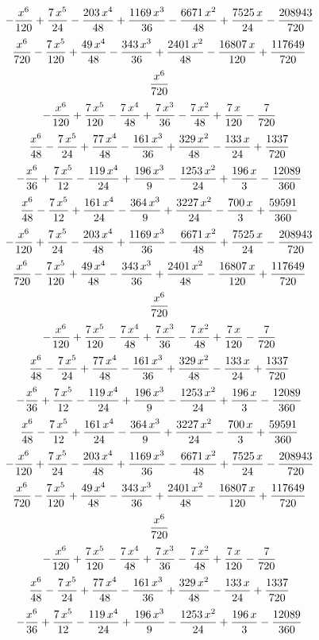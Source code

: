 $$-{{x^6}\over{120}}+{{7\,x^5}\over{24}}-{{203\,x^4}\over{48}}+{{1169
 \,x^3}\over{36}}-{{6671\,x^2}\over{48}}+{{7525\,x}\over{24}}-{{
 208943}\over{720}}$$
$${{x^6}\over{720}}-{{7\,x^5}\over{120}}+{{49\,x^4}\over{48}}-{{343\,
 x^3}\over{36}}+{{2401\,x^2}\over{48}}-{{16807\,x}\over{120}}+{{
 117649}\over{720}}$$
$${{x^6}\over{720}}$$
$$-{{x^6}\over{120}}+{{7\,x^5}\over{120}}-{{7\,x^4}\over{48}}+{{7\,x^
 3}\over{36}}-{{7\,x^2}\over{48}}+{{7\,x}\over{120}}-{{7}\over{720}}$$
$${{x^6}\over{48}}-{{7\,x^5}\over{24}}+{{77\,x^4}\over{48}}-{{161\,x^
 3}\over{36}}+{{329\,x^2}\over{48}}-{{133\,x}\over{24}}+{{1337}\over{
 720}}$$
$$-{{x^6}\over{36}}+{{7\,x^5}\over{12}}-{{119\,x^4}\over{24}}+{{196\,
 x^3}\over{9}}-{{1253\,x^2}\over{24}}+{{196\,x}\over{3}}-{{12089
 }\over{360}}$$
$${{x^6}\over{48}}-{{7\,x^5}\over{12}}+{{161\,x^4}\over{24}}-{{364\,x
 ^3}\over{9}}+{{3227\,x^2}\over{24}}-{{700\,x}\over{3}}+{{59591
 }\over{360}}$$
$$-{{x^6}\over{120}}+{{7\,x^5}\over{24}}-{{203\,x^4}\over{48}}+{{1169
 \,x^3}\over{36}}-{{6671\,x^2}\over{48}}+{{7525\,x}\over{24}}-{{
 208943}\over{720}}$$
$${{x^6}\over{720}}-{{7\,x^5}\over{120}}+{{49\,x^4}\over{48}}-{{343\,
 x^3}\over{36}}+{{2401\,x^2}\over{48}}-{{16807\,x}\over{120}}+{{
 117649}\over{720}}$$
$${{x^6}\over{720}}$$
$$-{{x^6}\over{120}}+{{7\,x^5}\over{120}}-{{7\,x^4}\over{48}}+{{7\,x^
 3}\over{36}}-{{7\,x^2}\over{48}}+{{7\,x}\over{120}}-{{7}\over{720}}$$
$${{x^6}\over{48}}-{{7\,x^5}\over{24}}+{{77\,x^4}\over{48}}-{{161\,x^
 3}\over{36}}+{{329\,x^2}\over{48}}-{{133\,x}\over{24}}+{{1337}\over{
 720}}$$
$$-{{x^6}\over{36}}+{{7\,x^5}\over{12}}-{{119\,x^4}\over{24}}+{{196\,
 x^3}\over{9}}-{{1253\,x^2}\over{24}}+{{196\,x}\over{3}}-{{12089
 }\over{360}}$$
$${{x^6}\over{48}}-{{7\,x^5}\over{12}}+{{161\,x^4}\over{24}}-{{364\,x
 ^3}\over{9}}+{{3227\,x^2}\over{24}}-{{700\,x}\over{3}}+{{59591
 }\over{360}}$$
$$-{{x^6}\over{120}}+{{7\,x^5}\over{24}}-{{203\,x^4}\over{48}}+{{1169
 \,x^3}\over{36}}-{{6671\,x^2}\over{48}}+{{7525\,x}\over{24}}-{{
 208943}\over{720}}$$
$${{x^6}\over{720}}-{{7\,x^5}\over{120}}+{{49\,x^4}\over{48}}-{{343\,
 x^3}\over{36}}+{{2401\,x^2}\over{48}}-{{16807\,x}\over{120}}+{{
 117649}\over{720}}$$
$${{x^6}\over{720}}$$
$$-{{x^6}\over{120}}+{{7\,x^5}\over{120}}-{{7\,x^4}\over{48}}+{{7\,x^
 3}\over{36}}-{{7\,x^2}\over{48}}+{{7\,x}\over{120}}-{{7}\over{720}}$$
$${{x^6}\over{48}}-{{7\,x^5}\over{24}}+{{77\,x^4}\over{48}}-{{161\,x^
 3}\over{36}}+{{329\,x^2}\over{48}}-{{133\,x}\over{24}}+{{1337}\over{
 720}}$$
$$-{{x^6}\over{36}}+{{7\,x^5}\over{12}}-{{119\,x^4}\over{24}}+{{196\,
 x^3}\over{9}}-{{1253\,x^2}\over{24}}+{{196\,x}\over{3}}-{{12089
 }\over{360}}$$
